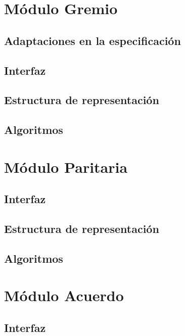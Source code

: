 \documentclass[10pt, a4paper]{article}
\begin{document}
\maketitle
\tableofcontents
\newpage

\section{M\'odulo Gremio} 
\subsection{Adaptaciones en la especificación}

\subsection{Interfaz}

\subsection{Estructura de representaci\'on}

\subsection{Algoritmos}

\newpage

\section{M\'odulo Paritaria} 
\subsection{Interfaz}

\subsection{Estructura de representaci\'on}

\subsection{Algoritmos}

\newpage

\section{M\'odulo Acuerdo} 
\subsection{Interfaz}

\end{document}
